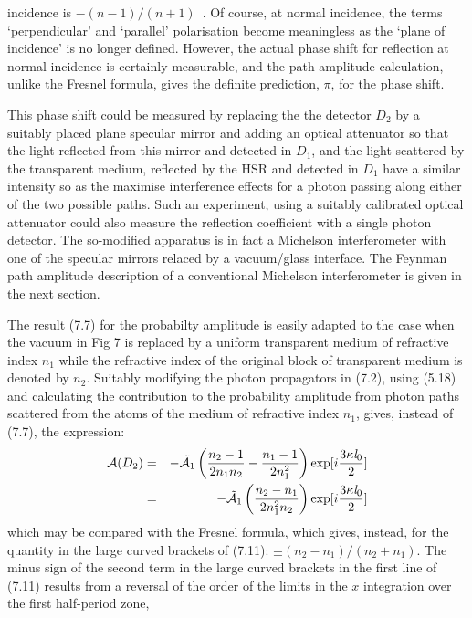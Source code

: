 {     incidence is $-(n-1)/(n+1)$~\cite{BW3}. Of course, at normal incidence, the terms `perpendicular'
    and `parallel' polarisation become meaningless as the `plane of incidence' is no longer
    defined. However, the actual phase shift for reflection at normal incidence is certainly
    measurable, and the path amplitude calculation, unlike the Fresnel formula, gives the
    definite prediction, $\pi$, for the phase shift. 
   \par This phase shift could be measured by replacing the the detector $D_2$ by a suitably placed
    plane specular mirror and adding an optical attenuator so that the light reflected from 
    this mirror and detected in $D_1$, and the light scattered by the transparent medium, reflected
    by the HSR and detected in $D_1$ have a similar intensity so as the maximise interference
    effects  for a photon passing along either of the two possible paths. Such an experiment,
    using a suitably calibrated optical attenuator could also measure the reflection coefficient
    with  a single photon detector. The so-modified apparatus is in fact a Michelson interferometer
    with one of the specular mirrors relaced by a vacuum/glass interface. The Feynman path amplitude
    description of a conventional  Michelson interferometer is given in the next section.
    \par The result (7.7) for the probabilty amplitude is easily adapted to the case when the vacuum
    in Fig 7 is replaced by a uniform transparent medium of refractive index $n_1$ while the refractive
    index of the original block of transparent medium is denoted by $n_2$. Suitably modifying
     the photon propagators in (7.2), using (5.18) and calculating the contribution to the 
     probability amplitude from photon paths scattered from the atoms of the medium of refractive
     index $n_1$, gives, instead of (7.7), the expression:
  \begin{eqnarray}
  {\cal A}(D_2) & = & -\tilde{{\cal A}}_1\left(\frac{n_2-1}{2n_1n_2} - \frac{n_1-1}{2n_1^2}\right)
   \exp[i\frac{3 \kappa {\it l}_0}{2}] \nonumber \\
   & = & -\tilde{{\cal A}}_1\left(\frac{n_2-n_1}{2n_1^2 n_2}\right) \exp[i\frac{3 \kappa {\it l}_0}{2}]
  \end{eqnarray}
  which may be compared with the Fresnel formula, which gives, instead, for the quantity in the 
  large curved brackets of (7.11): $\pm(n_2-n_1)/(n_2+n_1)$.
  The minus sign of the second term in the large curved brackets in the first line of (7.11) results
   from a reversal of the order of the limits in the $x$ integration over the first half-period zone,
}
